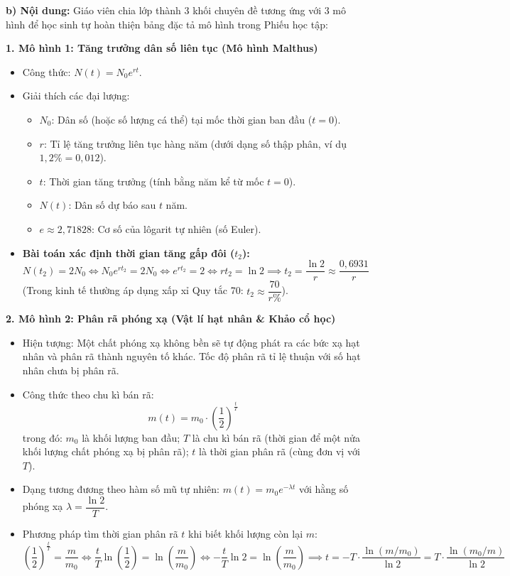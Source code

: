 \documentclass[12pt, a4paper]{article}
\begin{document}
\noindent \textbf{b) Nội dung:}
Giáo viên chia lớp thành 3 khối chuyên đề tương ứng với 3 mô hình để học sinh tự hoàn thiện bảng đặc tả mô hình trong Phiếu học tập:

\textbf{1. Mô hình 1: Tăng trưởng dân số liên tục (Mô hình Malthus)}
\begin{itemize}[leftmargin=0.6cm]
    \item Công thức: $N(t) = N_0 e^{rt}$.
    \item Giải thích các đại lượng:
    \begin{itemize}
        \item $N_0$: Dân số (hoặc số lượng cá thể) tại mốc thời gian ban đầu ($t = 0$).
        \item $r$: Tỉ lệ tăng trưởng liên tục hàng năm (dưới dạng số thập phân, ví dụ $1{,}2\% = 0{,}012$).
        \item $t$: Thời gian tăng trưởng (tính bằng năm kể từ mốc $t = 0$).
        \item $N(t)$: Dân số dự báo sau $t$ năm.
        \item $e \approx 2{,}71828$: Cơ số của lôgarit tự nhiên (số Euler).
    \end{itemize}
    \item \textbf{Bài toán xác định thời gian tăng gấp đôi ($t_2$):}
    $$N(t_2) = 2N_0 \iff N_0 e^{rt_2} = 2N_0 \iff e^{rt_2} = 2 \iff r t_2 = \ln 2 \implies t_2 = \dfrac{\ln 2}{r} \approx \dfrac{0{,}6931}{r}$$
    (Trong kinh tế thường áp dụng xấp xỉ Quy tắc 70: $t_2 \approx \dfrac{70}{r\%}$).
\end{itemize}

\textbf{2. Mô hình 2: Phân rã phóng xạ (Vật lí hạt nhân \& Khảo cổ học)}
\begin{itemize}[leftmargin=0.6cm]
    \item Hiện tượng: Một chất phóng xạ không bền sẽ tự động phát ra các bức xạ hạt nhân và phân rã thành nguyên tố khác. Tốc độ phân rã tỉ lệ thuận với số hạt nhân chưa bị phân rã.
    \item Công thức theo chu kì bán rã:
    $$m(t) = m_0 \cdot \left(\dfrac{1}{2}\right)^{\frac{t}{T}}$$
    trong đó: $m_0$ là khối lượng ban đầu; $T$ là chu kì bán rã (thời gian để một nửa khối lượng chất phóng xạ bị phân rã); $t$ là thời gian phân rã (cùng đơn vị với $T$).
    \item Dạng tương đương theo hàm số mũ tự nhiên: $m(t) = m_0 e^{-\lambda t}$ với hằng số phóng xạ $\lambda = \dfrac{\ln 2}{T}$.
    \item Phương pháp tìm thời gian phân rã $t$ khi biết khối lượng còn lại $m$:
    $$\left(\dfrac{1}{2}\right)^{\frac{t}{T}} = \dfrac{m}{m_0} \iff \dfrac{t}{T} \ln\left(\dfrac{1}{2}\right) = \ln\left(\dfrac{m}{m_0}\right) \iff -\dfrac{t}{T} \ln 2 = \ln\left(\dfrac{m}{m_0}\right) \implies t = -T \cdot \dfrac{\ln(m / m_0)}{\ln 2} = T \cdot \dfrac{\ln(m_0 / m)}{\ln 2}$$
\end{itemize}
\end{document}
